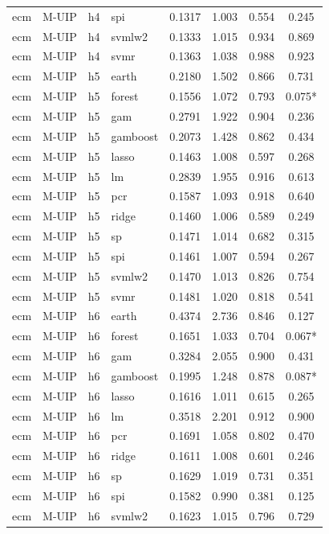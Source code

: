 \begin{ThreePartTable}
\begin{longtable}[t]{llclcccc}
ecm & M-UIP & h4 & spi & 0.1317 & 1.003 & 0.554 & 0.245\\
ecm & M-UIP & h4 & svmlw2 & 0.1333 & 1.015 & 0.934 & 0.869\\
ecm & M-UIP & h4 & svmr & 0.1363 & 1.038 & 0.988 & 0.923\\
\addlinespace
ecm & M-UIP & h5 & earth & 0.2180 & 1.502 & 0.866 & 0.731\\
ecm & M-UIP & h5 & forest & 0.1556 & 1.072 & 0.793 & 0.075*\\
ecm & M-UIP & h5 & gam & 0.2791 & 1.922 & 0.904 & 0.236\\
ecm & M-UIP & h5 & gamboost & 0.2073 & 1.428 & 0.862 & 0.434\\
ecm & M-UIP & h5 & lasso & 0.1463 & 1.008 & 0.597 & 0.268\\
ecm & M-UIP & h5 & lm & 0.2839 & 1.955 & 0.916 & 0.613\\
ecm & M-UIP & h5 & pcr & 0.1587 & 1.093 & 0.918 & 0.640\\
ecm & M-UIP & h5 & ridge & 0.1460 & 1.006 & 0.589 & 0.249\\
ecm & M-UIP & h5 & sp & 0.1471 & 1.014 & 0.682 & 0.315\\
ecm & M-UIP & h5 & spi & 0.1461 & 1.007 & 0.594 & 0.267\\
ecm & M-UIP & h5 & svmlw2 & 0.1470 & 1.013 & 0.826 & 0.754\\
ecm & M-UIP & h5 & svmr & 0.1481 & 1.020 & 0.818 & 0.541\\
\addlinespace
ecm & M-UIP & h6 & earth & 0.4374 & 2.736 & 0.846 & 0.127\\
ecm & M-UIP & h6 & forest & 0.1651 & 1.033 & 0.704 & 0.067*\\
ecm & M-UIP & h6 & gam & 0.3284 & 2.055 & 0.900 & 0.431\\
ecm & M-UIP & h6 & gamboost & 0.1995 & 1.248 & 0.878 & 0.087*\\
ecm & M-UIP & h6 & lasso & 0.1616 & 1.011 & 0.615 & 0.265\\
ecm & M-UIP & h6 & lm & 0.3518 & 2.201 & 0.912 & 0.900\\
ecm & M-UIP & h6 & pcr & 0.1691 & 1.058 & 0.802 & 0.470\\
ecm & M-UIP & h6 & ridge & 0.1611 & 1.008 & 0.601 & 0.246\\
ecm & M-UIP & h6 & sp & 0.1629 & 1.019 & 0.731 & 0.351\\
ecm & M-UIP & h6 & spi & 0.1582 & 0.990 & 0.381 & 0.125\\
ecm & M-UIP & h6 & svmlw2 & 0.1623 & 1.015 & 0.796 & 0.729\\

\end{longtable}
\end{ThreePartTable}
